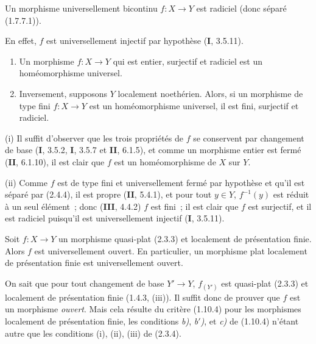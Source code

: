 \begin{proposition}[2.4.4]
\label{IV.2.4.4-fr}
Un morphisme universellement bicontinu $f:X\to Y$ est radiciel (donc séparé
\textup{(1.7.7.1)}).
\end{proposition}

En effet, $f$ est universellement injectif par hypothèse (\textbf{I}, 3.5.11).

\begin{proposition}[2.4.5]
\begin{enumerate}
\item[\textup{(i)}] Un morphisme $f:X\to Y$ qui est entier, surjectif et radiciel est
un homéomorphisme universel.
\item[\textup{(ii)}] Inversement, supposons $Y$ localement noethérien. Alors, si un
morphisme de type fini $f:X\to Y$ est un homéomorphisme universel, il est
fini, surjectif et radiciel.
\end{enumerate}
\end{proposition}

(i) Il suffit d'observer que les trois propriétés de $f$ se conservent par
changement de base (\textbf{I}, 3.5.2, \textbf{I}, 3.5.7 et \textbf{II}, 6.1.5), et comme un morphisme
entier est fermé (\textbf{II}, 6.1.10), il est clair que $f$ est un homéomorphisme de
$X$ sur $Y$.

(ii) Comme $f$ est de type fini et universellement fermé par hypothèse et
qu'il est séparé par (2.4.4), il est propre (\textbf{II}, 5.4.1), et pour tout
$y\in Y$, $f^{-1}(y)$ est réduit à un seul élément~; donc (\textbf{III}, 4.4.2) $f$
est fini~; il est clair que $f$ est surjectif, et il est radiciel puisqu'il
est universellement injectif (\textbf{I}, 3.5.11).

\begin{theorem}[2.4.6]
\label{IV.2.4.6-fr}
Soit $f:X\to Y$ un morphisme quasi-plat \textup{(2.3.3)} et localement de présentation
finie. Alors $f$ est universellement ouvert. En particulier, un morphisme plat
localement de présentation finie est universellement ouvert.
\end{theorem}

On sait que pour tout changement de base $Y'\to Y$, $f_{(Y')}$ est
quasi-plat (2.3.3) et localement de présentation finie (1.4.3, (iii)). Il
suffit donc de prouver que $f$ est un
morphisme \emph{ouvert}. Mais cela résulte du critère (1.10.4) pour les morphismes
localement de présentation finie, les conditions \emph{b)}, \emph{b$'$)}, et
\emph{c)} de (1.10.4) n'étant autre que les conditions (i), (ii), (iii) de
(2.3.4).

